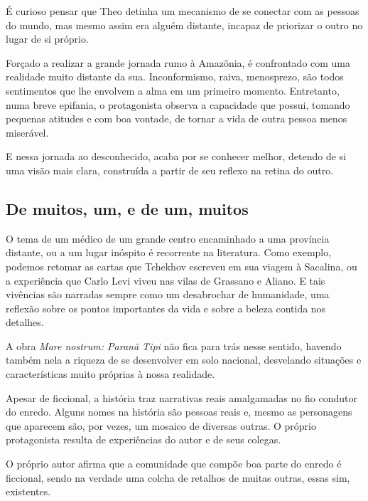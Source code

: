 \documentclass[12pt]{extarticle}
\begin{document}
É curioso pensar que Theo detinha um mecanismo de se conectar com as pessoas do mundo, mas mesmo assim era alguém distante, incapaz de priorizar o outro no lugar de si próprio.

Forçado a realizar a grande jornada rumo à Amazônia, é confrontado com
uma realidade muito distante da sua. Inconformismo, raiva, menosprezo,
são todos sentimentos que lhe envolvem a alma em um primeiro momento.
Entretanto, numa breve epifania, o
protagonista observa a capacidade que possui, tomando pequenas atitudes e com boa vontade, de
tornar a vida de outra pessoa menos miserável.

E nessa jornada ao desconhecido, acaba por se conhecer melhor, detendo
de si uma visão mais clara, construída a partir de seu reflexo na retina
do outro.


\subsection{De muitos, um, e de um, muitos}

O tema de um médico de um grande centro encaminhado a uma província
distante, ou a um lugar inóspito é recorrente na literatura. Como
exemplo, podemos retomar as cartas que Tchekhov escreveu em sua viagem à
Sacalina, ou a experiência que Carlo Levi viveu nas vilas de Grassano e
Aliano. E tais vivências são narradas sempre como um desabrochar de
humanidade, uma reflexão sobre os pontos importantes da vida e sobre a
beleza contida nos detalhes.

A obra \emph{Mare nostrum: Paranã Tipi} não fica para trás nesse sentido,
havendo também nela a riqueza de se desenvolver em solo nacional,
desvelando situações e características muito próprias à nossa realidade.

Apesar de ficcional, a história traz narrativas reais amalgamadas no fio
condutor do enredo. Alguns nomes na história são pessoas reais e, mesmo
as personagens que aparecem são, por vezes, um mosaico de diversas
outras. O próprio protagonista resulta de experiências do autor e de
seus colegas.

O próprio autor afirma que a comunidade que compõe boa parte do enredo é
ficcional, sendo na verdade uma colcha de retalhos de muitas outras,
essas sim, existentes.
\end{document}
